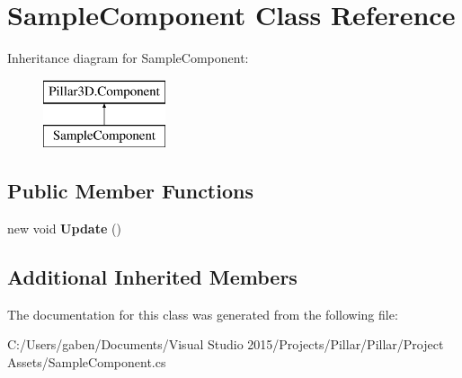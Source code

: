 \hypertarget{class_sample_component}{}\section{Sample\+Component Class Reference}
\label{class_sample_component}
Inheritance diagram for Sample\+Component\+:\begin{figure}[H]
\begin{center}
\leavevmode
\includegraphics[height=2.000000cm]{class_sample_component}
\end{center}
\end{figure}
\subsection*{Public Member Functions}
\begin{DoxyCompactItemize}
\item 
\mbox{\label{class_sample_component_ad314fb7299417e9eee4955f5d11c1b2e}} 
new void {\bfseries Update} ()
\end{DoxyCompactItemize}
\subsection*{Additional Inherited Members}


The documentation for this class was generated from the following file\+:\begin{DoxyCompactItemize}
\item 
C\+:/\+Users/gaben/\+Documents/\+Visual Studio 2015/\+Projects/\+Pillar/\+Pillar/\+Project Assets/Sample\+Component.\+cs\end{DoxyCompactItemize}
